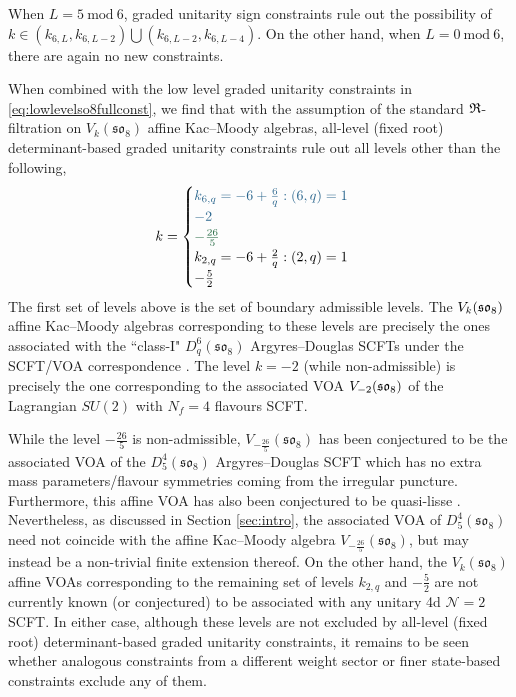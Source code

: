 When $L = 5~\text{mod}~6$, graded unitarity sign constraints rule out the possibility of $k \in (k_{6,L}, k_{6,L-2}) \bigcup (k_{6,L-2}, k_{6,L-4})$. On the other hand, when $L = 0~\text{mod}~6$, there are again no new constraints. 

When combined with the low level graded unitarity constraints in \eqref{eq:lowlevelso8fullconst}, we find that with the assumption of the standard $\mathfrak{R}$-filtration on $V_k(\mathfrak{so}_8)$ affine Kac--Moody algebras, all-level (fixed root) determinant-based graded unitarity constraints rule out all levels other than the following,
\begin{equation} \label{eq:so8alllevel}
    k = \begin{cases}
        \textcolor{knownSCFTtext}{k_{6,q} = -6 + \frac{6}{q}: (6,q) = 1} \\
        \textcolor{knownSCFTtext}{-2} \\
        \textcolor{conjecturedSCFTtext}{-\frac{26}{5}} \\
        k_{2,q} = -6 + \frac{2}{q}: (2,q) = 1 \\
        -\frac{5}{2}
    \end{cases}
\end{equation}
The first set of levels above is the set of boundary admissible levels. The $V_k(\mathfrak{so}_8)$ affine Kac--Moody algebras corresponding to these levels are precisely the ones associated with the ``class-I" $D_q^6(\mathfrak{so}_8)$ Argyres--Douglas SCFTs under the SCFT/VOA correspondence \cite{Xie:2016evu, Song:2017oew}. The level $k = -2$ (while non-admissible) is precisely the one corresponding to the associated VOA $V_{-2}(\mathfrak{so}_8)$ of the Lagrangian $SU(2)$ with $N_f = 4$ flavours SCFT. 

While the level $-\frac{26}{5}$ is non-admissible, $V_{-\frac{26}{5}}(\mathfrak{so}_8)$ has been conjectured to be the associated VOA of the $D^4_5(\mathfrak{so}_8)$ Argyres--Douglas SCFT which has no extra mass parameters/flavour symmetries coming from the irregular puncture. Furthermore, this affine VOA has also been conjectured to be quasi-lisse \cite{adamovic2026new}. Nevertheless, as discussed in Section \ref{sec:intro}, the associated VOA of $D^4_5(\mathfrak{so}_8)$ need not coincide with the affine Kac--Moody algebra $V_{-\frac{26}{5}}(\mathfrak{so}_8)$, but may instead be a non-trivial finite extension thereof. On the other hand, the $V_k(\mathfrak{so}_8)$ affine VOAs corresponding to the remaining set of levels $k_{2,q}$ and  $-\frac{5}{2}$ are not currently known (or conjectured) to be associated with any unitary 4d $\mathcal{N} = 2$ SCFT. In either case, although these levels are not excluded by all-level (fixed root) determinant-based graded unitarity constraints, it remains to be seen whether analogous constraints from a different weight sector or finer state-based constraints exclude any of them. 

